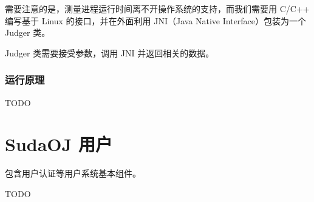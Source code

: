 需要注意的是，测量进程运行时间离不开操作系统的支持，而我们需要用 C/C++ 编写基于
Linux 的接口，并在外面利用 JNI（Java Native Interface）包装为一个 Judger 类。

Judger 类需要接受参数，调用 JNI 并返回相关的数据。

\subsubsection{运行原理}

TODO

\section{SudaOJ 用户}
包含用户认证等用户系统基本组件。

TODO

